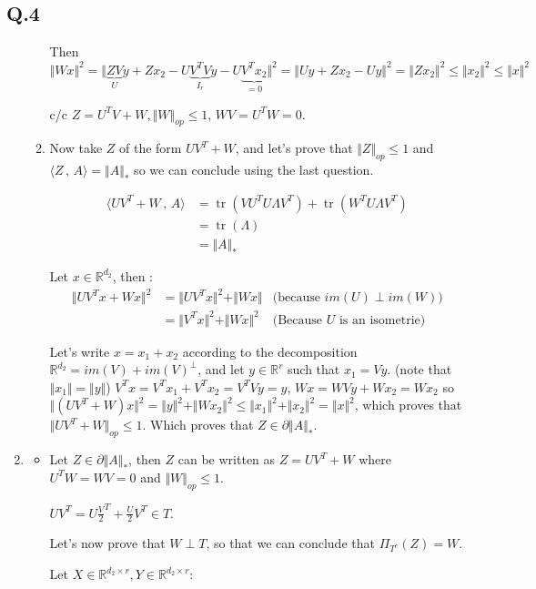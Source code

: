 \documentclass[12pt]{article}
\newcommand{\Q}[1]{\subsection*{Q.#1}}
\newenvironment{question}[1]
{\Q{#1}}{}
\newcommand{\norm}[1]{\Vert #1 \Vert}
\newcommand{\nucnorm}[1]{\Vert #1 \Vert_*}
\newcommand{\opnorm}[1]{\Vert #1 \Vert_{op}}
\newcommand{\inner}[2]{\langle #1 \, , \, #2 \rangle}
\DeclareMathOperator{\tr}{tr}
\begin{document}
\begin{question}{4}
\begin{enumerate}
\begin{enumerate}
      Then $\norm{Wx}^2 = \norm{\underbrace{ZV}_{U}y + Zx_2 - U\underbrace{V^TV}_{I_r}y - U\underbrace{V^Tx_2}_{=0}}^2 = \norm{Uy + Zx_2 - Uy}^2 = \norm{Zx_2}^2 \le \norm{x_2}^2 \le \norm{x}^2$

      c/c $Z = U^TV + W, \opnorm{W} \le 1$, $WV = U^TW = 0$.
      
    \item Now take $Z$ of the form $UV^T + W$, and let's prove that $\opnorm{Z} \le 1$ and $\inner{Z}{A} = \nucnorm{A}$ so we can conclude using the last question.
      
      \begin{align*}
        \inner{UV^T + W}{A} &= \tr(V U^T U\Lambda V^T) + \tr(W^TU \Lambda V^T) \\
                            &= \tr(\Lambda)\\
                            &= \norm{A}_*
      \end{align*}

      Let $x \in \mathbb R^{d_2}$, then :
      \begin{align*}
        \norm{UV^Tx + Wx}^2 &= \norm{UV^Tx}^2 + \norm{Wx} &\text{(because $im(U) \perp im(W)$)}
        \\ &= \norm{V^Tx}^2 + \norm{Wx}^2 &\text{(Because $U$ is an isometrie)}
      \end{align*}

      Let's write $x = x_1 + x_2$ according to the decomposition $\mathbb R^{d_2} = im(V) + im(V)^{\perp}$, and let $y \in \mathbb R^r$ such that $x_1 = Vy$. (note that $\norm{x_1} = \norm{y}$)
      $V^Tx = V^T x_1 + V^T x_2 = V^TVy = y$, 
      $Wx = WV y + Wx_2 = Wx_2$ 
      so $\norm{(UV^T + W)x}^2 = \norm{y}^2 + \norm{Wx_2}^2 \le \norm{x_1}^2 + \norm{x_2}^2 = \norm{x}^2$, which proves that $\opnorm{UV^T + W} \le 1$. Which proves that $Z \in \partial \nucnorm{A}$.
      
    \end{enumerate}
  \item[4.5]
    \begin{itemize}
    \item Let $Z \in \partial \nucnorm{A}$, then $Z$ can be written as $Z = UV^T + W$ where $U^TW = WV = 0$ and $\opnorm{W} \le 1$.

      $UV^T = U\frac V2^T + \frac U2V^T \in T$.
      
      Let's now prove that $W \perp T$, so that we can conclude that $\Pi_{T^c}(Z) = W$.

      Let $X \in \mathbb R^{d_2 \times r}, Y \in \mathbb R^{d_2 \times r}$:
      

\end{itemize}
\end{enumerate}
\end{question}
\end{document}
